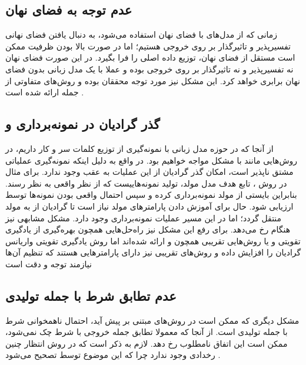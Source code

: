 \subsection{عدم توجه به فضای نهان} \label{chap1:latent_ignore}
زمانی که از مدل‌های با فضای نهان استفاده می‌شود، به دنبال یافتن فضای نهانی تفسیرپذیر و تاثیرگذار بر روی خروجی \decoder{} هستیم؛ اما در صورت بالا بودن ظرفیت \decoder{} ممکن است مستقل از فضای نهان، توزیع داده اصلی را فرا بگیرد. در این صورت فضای نهان نه تفسیرپذیر و نه تاثیرگذار بر روی خروجی \decoder{} بوده و عملا با یک مدل زبانی بدون فضای نهان برابری خواهد کرد. این مشکل نیز مورد توجه محققان بوده و روش‌های متفاوتی از جمله \wae{}
  ارائه شده است \cite{wae, infovae, vae_lagging, vae_lossy}.
\subsection{گذر گرادیان در نمونه‌برداری و \argmaxphrase{}}
از آنجا که در حوزه مدل زبانی با نمونه‌گیری از توزیع کلمات سر و کار داریم، در روش‌هایی مانند \gan{} با مشکل مواجه خواهیم بود. در واقع به دلیل اینکه نمونه‌گیری عملیاتی مشتق نا‌پذیر است، امکان گذر گرادیان از این عملیات به عقب وجود ندارد. برای مثال در روش \gan{}، تابع هدف مدل مولد، تولید نمونه‌هاییست که از نظر \discriminator{} واقعی به نظر رسند. بنابراین بایستی از مولد نمونه‌برداری کرده و سپس احتمال واقعی بودن نمونه‌ها توسط \discriminator{} ارزیابی شود. حال برای آموزش دادن پارامتر‌های مولد نیاز است تا گرادیان از \discriminator{} به مولد منتقل گردد؛ اما در این مسیر عملیات نمونه‌برداری وجود دارد. مشکل مشابهی نیز هنگام 
 رخ می‌دهد. برای رفع این مشکل نیز راه‌حل‌هایی همچون بهره‌گیری از یادگیری تقویتی و یا روش‌هایی تقریبی همچون  و  ارائه شده‌اند اما روش یادگیری تقویتی واریانس گرادیان را افزایش داده و روش‌های تقریبی نیز دارای پارامتر‌هایی هستند که تنظیم آن‌ها نیازمند توجه و دقت است \cite{seqgan, gumbel}
\subsection{عدم تطابق شرط با جمله تولیدی}
مشکل دیگری که ممکن است در روش‌های مبتنی بر \likelihood{} پیش آید، احتمال ناهمخوانی شرط با جمله تولیدی است. از آنجا که معمولا تطابق جمله خروجی با شرط چک نمی‌شود، ممکن است این اتفاق نامطلوب رخ دهد. لازم به ذکر است که در روش \gan{} انتظار چنین رخدادی وجود ندارد چرا که این موضوع توسط \discriminator{} تصحیح می‌شود \cite{toward}.
